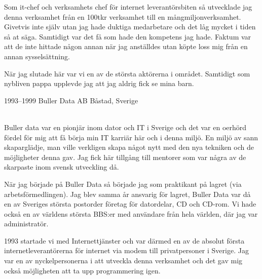 \documentclass[]{cv-style}          %
\begin{document}
\begin{entrylist}
{    Som it-chef och verksamhets chef för internet leverantörsbiten så utvecklade
    jag denna verksamhet från en 100tkr verksamhet till en mångmiljonverksamhet.
    Givetvis inte själv utan jag hade duktiga medarbetare och det låg mycket i
    tiden så at säga. Samtidigt var det få som hade den kompetens jag hade.
    Faktum var att de inte hittade någon annan när jag anställdes utan köpte
    loss mig från en annan sysselsättning.

    När jag slutade här var vi en av de största aktörerna i området. Samtidigt
    som nybliven pappa upplevde jag att jag aldrig fick se mina barn.

} 
\entry
  {1993--1999}
  {Buller Data AB}
  {Båstad, Sverige}
  {\\
    Buller data var en pionjär inom dator och IT i Sverige och det var en
    oerhörd fördel för mig att få börja min IT karriär här och i denna 
    miljö. En miljö av sann skaparglädje, man ville verkligen skapa något
    nytt med den nya tekniken och de möjligheter denna gav. Jag fick här
    tillgång till mentorer som var några av de skarpaste inom svensk utveckling
    då. 

    När jag började på Buller Data så började jag som praktikant på lagret (via 
    arbetsförmedlingen). Jag blev samma år ansvarig för lagret, Buller Data var
    då en av Sveriges största postorder företag för datordelar, CD och CD-rom.
    Vi hade också en av världens största BBS:er med användare från hela världen,
    där jag var administratör.

    1993 startade vi med Internettjänster och var därmed en av de absolut första 
    internetleverantörerna för internet via modem till privatpersoner i Sverige.
    Jag var en av nyckelpersonerna i att utveckla denna verksamhet och det gav
    mig också möjligheten att ta upp programmering igen.

}
\pagebreak

\end{entrylist}
\end{document}
